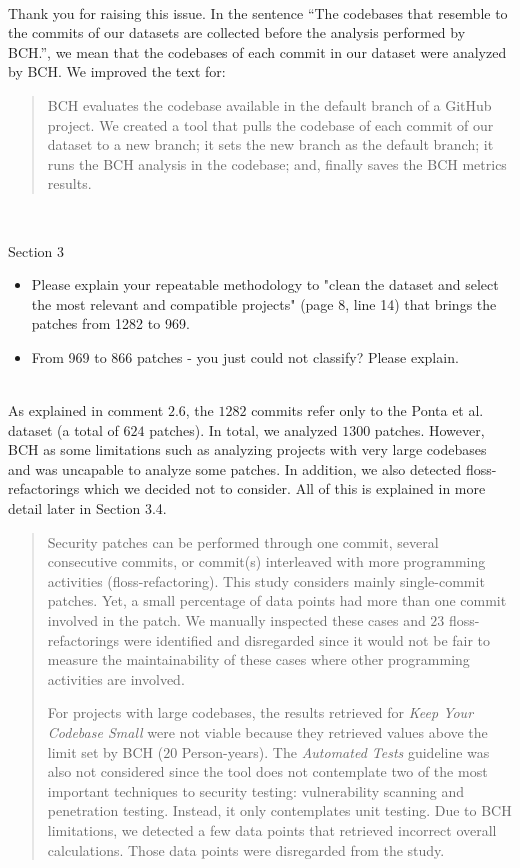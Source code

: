 \documentclass[11pt,fleqn]{article}
\newcommand{\eline}{\vspace*{.75\baselineskip}}
\newcommand{\Referee}[1]{\eline \noindent {\bf Reviewer comment #1:} \\}
\newcommand{\Us}{\eline \noindent {\bf Response:}\\}
\newenvironment{revcomment}[1][]
{\Referee{#1}\begin{rcomment}}
{\end{rcomment}}
\begin{document}
\Us Thank you for raising this issue. In the sentence ``The codebases that resemble to the commits of our datasets 
are collected before the analysis performed by BCH.'', we mean that the codebases of each commit in 
our dataset were analyzed by BCH. We improved the text for:

\begin{quote}
    BCH evaluates the codebase available in the default branch of a GitHub project. 
  We created a tool that pulls the codebase of each commit of our dataset 
  to a new branch; it sets the new branch as the default branch; it runs 
  the BCH analysis in the codebase; and, finally saves the BCH metrics
  results.
\end{quote}

\begin{revcomment}[2.9]
    Section 3\\
    \begin{itemize}
        \item Please explain your repeatable methodology to "clean the dataset and select the most relevant and 
        compatible projects" (page 8, line 14) that brings the patches from 1282 to 969.  
        \item From 969 to 866 patches - 
        you just could not classify?  Please explain.
    \end{itemize}
\end{revcomment}

\Us As explained in comment $2.6$, the $1282$ commits refer only to the Ponta et al. dataset (a total of $624$ 
patches). In total, we analyzed $1300$ patches. However, BCH as some limitations such as
analyzing projects with very large codebases and was uncapable to analyze some patches. In addition,
we also detected floss-refactorings which we decided not to consider. All of this is explained
in more detail later in Section 3.4. 

\begin{quote}
    Security patches can be performed through one commit, 
several consecutive commits, or commit(s) interleaved with more 
programming activities (floss-refactoring). This study considers 
mainly single-commit patches. Yet, a small percentage of data points 
had more than one commit involved in the patch. We manually 
inspected these cases and $23$ floss-refactorings were identified 
and disregarded since it would not be fair to measure the 
maintainability of these cases where other programming activities 
are involved.

For projects with large codebases, the results retrieved for 
\emph{Keep Your Codebase Small} were not viable because they 
retrieved values above the limit set by BCH ($20$ Person-years). The 
\emph{Automated Tests} guideline was also not considered since the 
tool does not contemplate two of the most important techniques to 
security testing: vulnerability scanning and penetration testing. 
Instead, it only contemplates unit testing. Due to BCH limitations, 
we detected a few data points that retrieved incorrect overall 
calculations. Those data points were disregarded from the study.
\end{quote}
\end{document}
